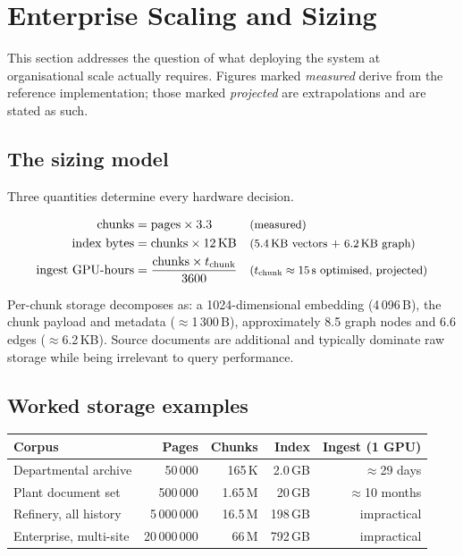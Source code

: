 \section{Enterprise Scaling and Sizing}

This section addresses the question of what deploying the system at
organisational scale actually requires. Figures marked \emph{measured} derive
from the reference implementation; those marked \emph{projected} are
extrapolations and are stated as such.

\subsection{The sizing model}

Three quantities determine every hardware decision.

\begin{align*}
\text{chunks} &= \text{pages} \times 3.3 && \text{\small(measured)}\\
\text{index bytes} &= \text{chunks} \times 12\,\text{KB}
   && \text{\small(5.4\,KB vectors + 6.2\,KB graph)}\\
\text{ingest GPU-hours} &= \frac{\text{chunks} \times t_{\text{chunk}}}{3600}
   && \text{\small($t_{\text{chunk}} \approx 15$\,s optimised, projected)}
\end{align*}

\noindent Per-chunk storage decomposes as: a 1024-dimensional
 embedding (4\,096\,B), the chunk payload and metadata
($\approx$1\,300\,B), approximately 8.5 graph nodes and 6.6 edges
($\approx$6.2\,KB). Source documents are additional and typically dominate raw
storage while being irrelevant to query performance.

\subsection{Worked storage examples}

\begin{center}
\renewcommand{\arraystretch}{1.25}
\begin{tabular}{@{}l r r r r@{}}
\toprule
\textbf{Corpus} & \textbf{Pages} & \textbf{Chunks} & \textbf{Index} & \textbf{Ingest (1 GPU)} \\
\midrule
Departmental archive & 50\,000 & 165\,K & 2.0\,GB & $\approx$29 days \\
Plant document set & 500\,000 & 1.65\,M & 20\,GB & $\approx$10 months \\
Refinery, all history & 5\,000\,000 & 16.5\,M & 198\,GB & impractical \\
Enterprise, multi-site & 20\,000\,000 & 66\,M & 792\,GB & impractical \\
\bottomrule
\end{tabular}
\end{center}

